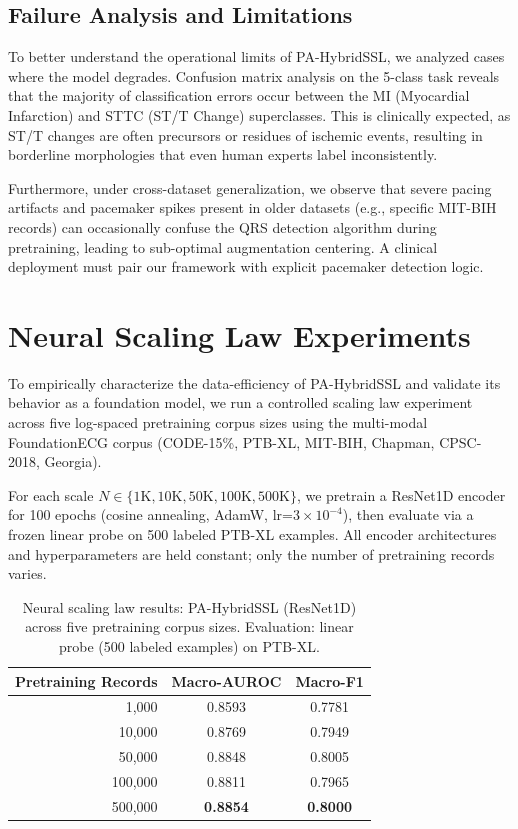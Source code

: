 \documentclass[journal,10pt]{IEEEtran}
\begin{document}
\subsection{Failure Analysis and Limitations}
To better understand the operational limits of PA-HybridSSL, we analyzed cases where the model degrades. Confusion matrix analysis on the 5-class task reveals that the majority of classification errors occur between the MI (Myocardial Infarction) and STTC (ST/T Change) superclasses. This is clinically expected, as ST/T changes are often precursors or residues of ischemic events, resulting in borderline morphologies that even human experts label inconsistently. 

Furthermore, under cross-dataset generalization, we observe that severe pacing artifacts and pacemaker spikes present in older datasets (e.g., specific MIT-BIH records) can occasionally confuse the QRS detection algorithm during pretraining, leading to sub-optimal augmentation centering. A clinical deployment must pair our framework with explicit pacemaker detection logic.




\section{Neural Scaling Law Experiments}
\label{sec:scaling}

To empirically characterize the data-efficiency of PA-HybridSSL and validate its behavior as a foundation model, we run a controlled scaling law experiment across five log-spaced pretraining corpus sizes using the multi-modal FoundationECG corpus (CODE-15\%, PTB-XL, MIT-BIH, Chapman, CPSC-2018, Georgia).

For each scale $N \in \{1\text{K}, 10\text{K}, 50\text{K}, 100\text{K}, 500\text{K}\}$, we pretrain a ResNet1D encoder for 100 epochs (cosine annealing, AdamW, lr=$3\times10^{-4}$), then evaluate via a frozen linear probe on 500 labeled PTB-XL examples. All encoder architectures and hyperparameters are held constant; only the number of pretraining records varies.

\begin{table}[h]
\centering
\caption{Neural scaling law results: PA-HybridSSL (ResNet1D) across five pretraining corpus sizes. Evaluation: linear probe (500 labeled examples) on PTB-XL.}
\label{tab:scaling}
\begin{tabular}{rcc}
\toprule
\textbf{Pretraining Records} & \textbf{Macro-AUROC} & \textbf{Macro-F1} \\
\midrule
1,000   & 0.8593 & 0.7781 \\
10,000  & 0.8769 & 0.7949 \\
50,000  & 0.8848 & 0.8005 \\
100,000 & 0.8811 & 0.7965 \\
500,000 & \textbf{0.8854} & \textbf{0.8000} \\
\bottomrule
\end{tabular}
\end{table}
\end{document}

